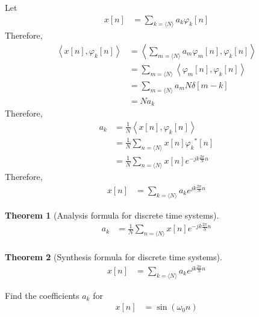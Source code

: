 \documentclass[titlepage, fleqn, a4paper, 12pt, twoside]{article}
\theoremstyle{definition}
\theoremstyle{theorem}
\newtheorem{theorem}{Theorem}
\begin{document}
Let
\begin{align*}
	x[n] &= \sum\limits_{k = \langle N \rangle} a_k \varphi_k[n]
\end{align*}
Therefore,
\begin{align*}
	\left\langle x[n],\varphi_k[n] \right\rangle &= \left\langle \sum\limits_{m = \langle N \rangle} a_m \varphi_m[n] , \varphi_k[n] \right\rangle\\
	&= \sum\limits_{m = \langle N \rangle} \left\langle \varphi_m[n],\varphi_k[n] \right\rangle\\
	&= \sum\limits_{m = \langle N \rangle} a_m N \delta[m - k]\\
	&= N a_k
\end{align*}
Therefore,
\begin{align*}
	a_k &= \frac{1}{N} \left\langle x[n],\varphi_k[n] \right\rangle\\
	&= \frac{1}{N} \sum\limits_{n = \langle N \rangle} x[n] {\varphi_k}^*[n]\\
	&= \frac{1}{N} \sum\limits_{n = \langle N \rangle} x[n] e^{-j k \frac{2 \pi}{N} n}
\end{align*}
Therefore,
\begin{align*}
	x[n] &= \sum\limits_{k = \langle N \rangle} a_k e^{j k \frac{2 \pi}{N} n}
\end{align*}

\begin{theorem}[Analysis formula for discrete time systems]
	\begin{align*}
		a_k &= \frac{1}{N} \sum\limits_{n = \langle N \rangle} x[n] e^{-j k \frac{2 \pi}{N} n}\\
	\end{align*}
	\label{thm:Analysis_formula_for_discrete_time_systems}
\end{theorem}

\begin{theorem}[Synthesis formula for discrete time systems]
	\begin{align*}
		x[n] &= \sum\limits_{k = \langle N \rangle} a_k e^{j k \frac{2 \pi}{N} n}
	\end{align*}
	\label{thm:Synthesis_formula_for_discrete_time_systems}
\end{theorem}

\begin{question}
	Find the coefficients $a_k$ for
	\begin{align*}
		x[n] &= \sin(\omega_0 n)
	\end{align*}
\end{question}
\end{document}
